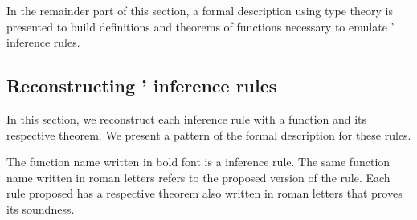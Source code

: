 \documentclass[../main.tex]{subfiles}
\begin{document}
In the remainder part of this section, a formal description using
type theory is presented to build definitions and theorems of
functions necessary to emulate \Metis' inference rules.


\subsection{Reconstructing \Metis' inference rules}
\label{ssec:emulating-inferences}

In this section, we reconstruct each \Metis inference rule with a
function and its respective theorem. We present a pattern of the
formal description for these rules.

\begin{notation}
The function name written in bold font is a \Metis inference rule.
The same function name written in roman letters refers to the proposed
version of the rule.
Each rule proposed has a respective theorem also written in roman letters
that proves its soundness.
\end{notation}
\end{document}
